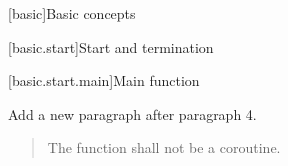 
\setcounter{chapter}{2}
[basic]{Basic concepts}

\setcounter{section}{5}
[basic.start]{Start and termination}

[basic.start.main]{Main function}

Add a new paragraph after paragraph 4.

\begin{quote}
	\setcounter{Paras}{4}
	\pnum
	The function  shall not be a coroutine.
\end{quote}
